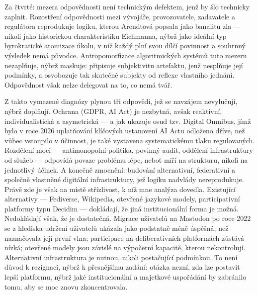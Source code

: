 Za čtvrté: mezera odpovědnosti není technickým defektem, jenž by šlo technicky zaplnit.
Rozostření odpovědnosti mezi vývojáře, provozovatele, zadavatele a regulátora reprodukuje logiku, kterou Arendtová popsala jako banalitu zla — nikoli jako historickou charakteristiku Eichmanna, nýbrž jako ideální typ byrokratické atomizace úkolu, v níž každý plní svou dílčí povinnost a souhrnný výsledek nemá původce.
Antropomorfizace algoritmických systémů tuto mezeru nezaplňuje, nýbrž maskuje: připisuje subjektivitu artefaktu, jenž nesplňuje její podmínky, a osvobozuje tak skutečné subjekty od reflexe vlastního jednání. Odpovědnost však nelze delegovat na to, co nemá tvář.



Z takto vymezené diagnózy plynou tři odpovědi, jež se navzájem nevylučují, nýbrž doplňují. Ochrana (GDPR, AI Act) je nezbytná, avšak reaktivní, individualistická a asymetrická — a jak ukazuje osud tzv.
Digital Omnibus, jímž bylo v roce 2026 uplatňování klíčových ustanovení AI Actu odloženo dříve, než vůbec vstoupilo v účinnost, je také vystavena systematickému tlaku regulovaných.
Rozdělení moci — antimonopolní politika, povinný audit, oddělení infrastruktury od služeb — odpovídá povaze problému lépe, neboť míří na strukturu, nikoli na jednotlivý účinek.
A konečně zmocnění: budování alternativní, federativní a společně vlastněné digitální infrastruktury, jež logiku nadvlády nereprodukuje.
Právě zde je však na místě střízlivost, k níž mne analýza dovedla.
Existující alternativy — Fediverse, Wikipedia, otevřené jazykové modely, participativní platformy typu Decidim — dokládají, že jiná institucionální forma je možná. Nedokládají však, že je dostatečná.
Migrace uživatelů na Mastodon po roce 2022 se z hlediska udržení uživatelů ukázala jako podstatně méně úspěšná, než naznačovala její první vlna;
participace na deliberativních platformách zůstává nízká; otevřené modely jsou závislé na výpočetní kapacitě, kterou nekontrolují.
Alternativní infrastruktura je nutnou, nikoli postačující podmínkou.
To není důvod k rezignaci, nýbrž k přesnějšímu zadání: otázka nezní, zda lze postavit lepší platformu, nýbrž jaké institucionální a majetkové uspořádání by zabránilo tomu, aby se moc znovu zkoncentrovala.



